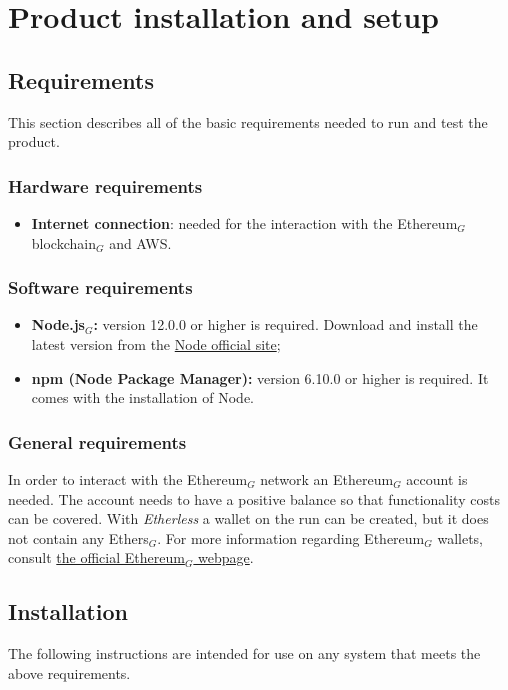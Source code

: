 \section{Product installation and setup}
  \subsection{Requirements}
    This section describes all of the basic requirements needed to run and test the product.
    \subsubsection{Hardware requirements}
      \begin{itemize}
      	\item \textbf{Internet connection}: needed for the interaction with the Ethereum$_{G}$ blockchain$_{G}$ and AWS.
      \end{itemize}
    \subsubsection{Software requirements}
      \begin{itemize}
        \item \textbf{Node.js$_{G}$:} version 12.0.0 or higher is required. Download and install the latest version from the \href{https://nodejs.org/it/download/}{Node official site};
        \item \textbf{npm (Node Package Manager):} version 6.10.0 or higher is required. It comes with the installation of Node.
      \end{itemize}
    \subsubsection{General requirements}
      In order to interact with the Ethereum$_{G}$ network an Ethereum$_{G}$ account is needed. The account needs to have a positive balance so that functionality costs can be covered. With \textit{Etherless} a wallet on the run can be created, but it does not contain any Ethers$_{G}$. For more information regarding Ethereum$_{G}$ wallets, consult \href{https://ethereum.org/en/wallets/}{the official Ethereum$_{G}$ webpage}.

  \subsection{Installation}
    The following instructions are intended for use on any system that meets the above requirements.

